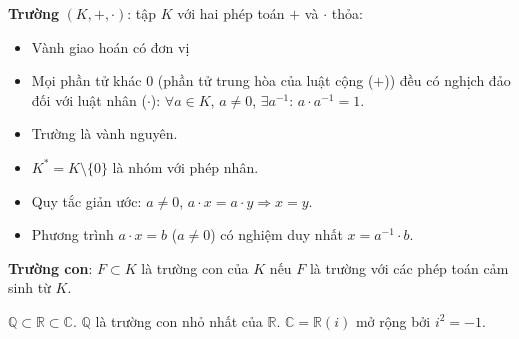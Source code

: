 \documentclass[12pt,a4paper]{article}
\begin{document}
\begin{dinhnghia}
  \textbf{Trường} $(K, +, \cdot)$: tập $K$ với hai phép toán $+$ và $\cdot$ thỏa:
  \begin{itemize}
    \item Vành giao hoán có đơn vị
    \item Mọi phần tử khác $0$ (phần tử trung hòa của luật cộng ($+$)) đều có nghịch đảo đối với luật nhân ($\cdot$): $\forall a \in K$, $a \ne 0$, $\exists a^{-1}$: $a \cdot a^{-1} = 1$.
  \end{itemize}
\end{dinhnghia}

\begin{tinhchat}[title={Tính chất của trường}]
  \begin{itemize}
    \item Trường là vành nguyên.
    \item $K^* = K \setminus \{0\}$ là nhóm với phép nhân.
    \item Quy tắc giản ước: $a \ne 0$, $a \cdot x = a \cdot y \Rightarrow x = y$.
    \item Phương trình $a \cdot x = b$ ($a \ne 0$) có nghiệm duy nhất $x = a^{-1} \cdot b$.
  \end{itemize}
\end{tinhchat}

\begin{dinhnghia}
  \textbf{Trường con}: $F \subset K$ là trường con của $K$ nếu $F$ là trường với các phép toán cảm sinh từ $K$.
\end{dinhnghia}

\begin{vidu}
  $\mathbb{Q} \subset \mathbb{R} \subset \mathbb{C}$. $\mathbb{Q}$ là trường con nhỏ nhất của $\mathbb{R}$. $\mathbb{C} = \mathbb{R}(i)$ mở rộng bởi $i^2 = -1$.
\end{vidu}
\end{document}
